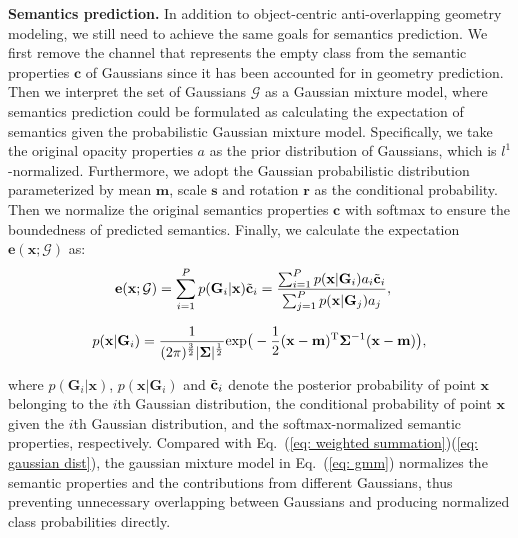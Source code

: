 \textbf{Semantics prediction.}
In addition to object-centric anti-overlapping geometry modeling, we still need to achieve the same goals for semantics prediction.
We first remove the channel that represents the empty class from the semantic properties $\mathbf{c}$ of Gaussians since it has been accounted for in geometry prediction.
Then we interpret the set of Gaussians $\mathcal{G}$ as a Gaussian mixture model, where semantics prediction could be formulated as calculating the expectation of semantics given the probabilistic Gaussian mixture model.
Specifically, we take the original opacity properties $a$ as the prior distribution of Gaussians, which is $l^1$-normalized.
Furthermore, we adopt the Gaussian probabilistic distribution parameterized by mean $\mathbf{m}$, scale $\mathbf{s}$ and rotation $\mathbf{r}$ as the conditional probability.
Then we normalize the original semantics properties $\mathbf{c}$ with softmax to ensure the boundedness of predicted semantics.
Finally, we calculate the expectation $\mathbf{e}(\mathbf{x};\mathcal{G})$ as:
\vspace{-1mm}
\begin{equation}
\begin{aligned}
    \mathbf{e}(\mathbf{x};\mathcal{G}) &= \sum_{i=1}^{P} p(\mathbf{G}_i|\mathbf{x})\Tilde{\mathbf{c}}_i 
    = \frac{\sum_{i=1}^{P}p(\mathbf{x}|\mathbf{G}_i)a_i\Tilde{\mathbf{c}}_i}{\sum_{j=1}^{P}p(\mathbf{x}|\mathbf{G}_j)a_j},
\end{aligned}
\label{eq: gmm}
\end{equation}
\begin{small}
\begin{equation}
    p(\mathbf{x}|\mathbf{G}_i) = \frac{1}{(2\pi)^{\frac{3}{2}}|\mathbf{\Sigma}|^{\frac{1}{2}}}{\rm{exp}}\big(-\frac{1}{2}(\mathbf{x}-\mathbf{m})^{\rm T} \mathbf{\Sigma}^{-1} (\mathbf{x}-\mathbf{m})\big),
\end{equation}
\end{small}where $p(\mathbf{G}_i|\mathbf{x})$, $p(\mathbf{x}|\mathbf{G}_i)$ and $\Tilde{\mathbf{c}}_i$ denote the posterior probability of point $\mathbf{x}$ belonging to the $i$th Gaussian distribution, the conditional probability of point $\mathbf{x}$ given the $i$th Gaussian distribution, and the softmax-normalized semantic properties, respectively. 
Compared with Eq.~(\ref{eq: weighted summation})(\ref{eq: gaussian dist}), the gaussian mixture model in Eq.~(\ref{eq: gmm}) normalizes the semantic properties and the contributions from different Gaussians, thus preventing unnecessary overlapping between Gaussians and producing normalized class probabilities directly.

